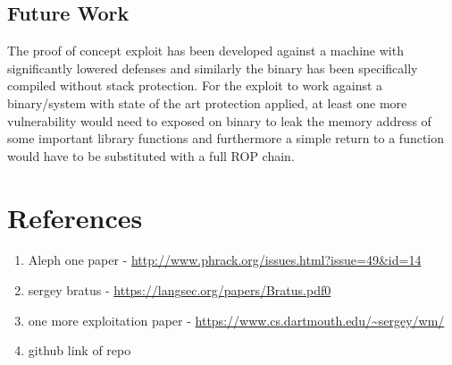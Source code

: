 \documentclass[a4paper,9pt]{report}
\begin{document}
\chapter{Future Work}
\label{sec:orgaa981a5}

The proof of concept exploit has been developed against a machine with significantly lowered defenses and similarly the binary has been specifically compiled without stack protection. For the exploit to work against a binary/system with state of the art protection applied, at least one more vulnerability would need to exposed on binary to leak the memory address of some important library functions and furthermore a simple return to a function would have to be substituted with a full ROP chain.\\


\part{References}
\label{sec:org3ccdbcb}

\begin{enumerate}
\item Aleph one paper - \url{http://www.phrack.org/issues.html?issue=49\&id=14}\\
\item sergey bratus - \url{https://langsec.org/papers/Bratus.pdf0}\\
\item one more exploitation paper - \url{https://www.cs.dartmouth.edu/\~sergey/wm/}\\
\item github link of repo\\
\end{enumerate}
\end{document}
